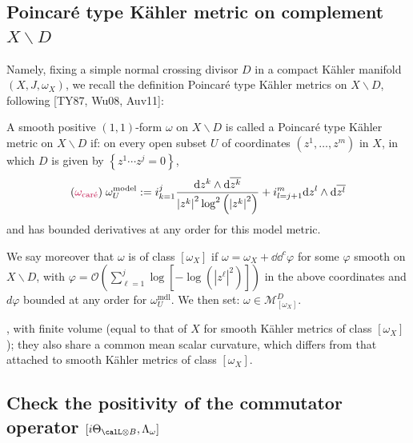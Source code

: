 \documentclass[lang=en,12pt]{beautybook}
\begin{document}
\subsection{Poincar\'e type
  K\"ahler metric on complement \texorpdfstring{$X\backslash D$}{}}

Namely\cite[Introduction,Definition 2]{auvray2013note}, fixing a simple normal crossing divisor $D$ in a compact K\"ahler manifold $\left(X, J, \omega_X\right)$, we recall the definition Poincaré type Kähler metrics on $X \backslash D$, following [TY87, Wu08, Auv11]:

\begin{definition}
  A smooth positive $(1,1)$-form $\omega$ on $X \backslash D$ is called a Poincaré type Kähler metric on $X \backslash D$ if: on every open subset $U$ of coordinates $\left(z^1, \ldots, z^m\right)$ in $X$, in which $D$ is given by $\left\{z^1 \cdots z^j=0\right\}$, 
  \begin{equation*}
    ({\color{purple}\omega_{\text{car\'e}}})\;\omega_U^{\mathrm{model}}:=i\relax_{k=1}^{j}\frac{ \dd z^k \wedge \dd \overline{z^k}}{\left|z^k\right|^2 \log ^2\left(\left|z^k\right|^2\right)}+i\relax_{l=j+1}^{m} \dd z^{l} \wedge \dd \overline{z^{l}}
  \end{equation*}
  and has bounded derivatives at any order for this model metric.

  We say moreover that $\omega$ is of class $\left[\omega_X\right]$ if $\omega=\omega_X+\dd \dd^c \varphi$ for some $\varphi$ smooth on $X \backslash D$, with $\varphi=\mathcal{O}\left(\sum_{\ell=1}^j \log \left[-\log \left(\left|z^{\ell}\right|^2\right)\right]\right)$ in the above coordinates and $d \varphi$ bounded at any order for $\omega_U^{\mathrm{mdl}}$. We then set: $\omega \in \mathscr{M}_{\left[\omega_X\right]}^D$.
\end{definition}

\vspace{.3em}, with finite volume (equal to that of $X$ for smooth Kähler metrics of class $\left[\omega_X\right]$ ); they also share a common mean scalar curvature, which differs from that attached to smooth Kähler metrics of class $\left[\omega_X\right]$.

\subsection{Check the positivity of the commutator operator \texorpdfstring{$[i\Theta_{\calL\otimes B},\Lambda_\omega]$}{}}
\end{document}
